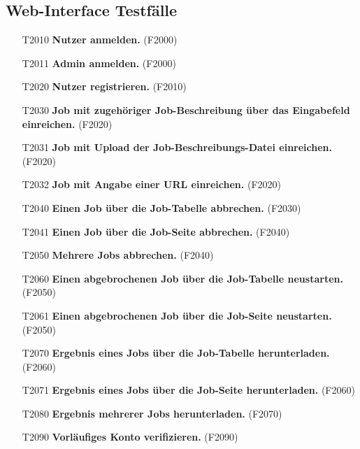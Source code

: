\subsection{Web-Interface Testfälle}

\begin{itemize}
    \item[T2010] \textbf{Nutzer anmelden.} (F2000)
    
    \item[T2011] \textbf{Admin anmelden.} (F2000)
    
    \item[T2020] \textbf{Nutzer registrieren.} (F2010)
    
    \item[T2030] \textbf{Job mit zugehöriger Job-Beschreibung über das Eingabefeld einreichen.} (F2020)
    
    \item[T2031] \textbf{Job mit Upload der Job-Beschreibungs-Datei einreichen.} (F2020)
    
    \item[T2032] \textbf{Job mit Angabe einer URL einreichen.} (F2020)
    
    \item[T2040] \textbf{Einen Job über die Job-Tabelle abbrechen.} (F2030)
    
    \item[T2041] \textbf{Einen Job über die Job-Seite abbrechen.} (F2040)
    
    \item[T2050] \textbf{Mehrere Jobs abbrechen.} (F2040)
    
    \item[T2060] \textbf{Einen abgebrochenen Job über die Job-Tabelle neustarten.} (F2050)
    
    \item[T2061] \textbf{Einen abgebrochenen Job über die Job-Seite neustarten.} (F2050)
    
    \item[T2070] \textbf{Ergebnis eines Jobs über die Job-Tabelle herunterladen.} (F2060)
    
    \item[T2071] \textbf{Ergebnis eines Jobs über die Job-Seite herunterladen.} (F2060)
    
    \item[T2080] \textbf{Ergebnis mehrerer Jobs herunterladen.} (F2070)
    
    \item[T2090] \textbf{Vorläufiges Konto verifizieren.} (F2090)
    

\end{itemize}
